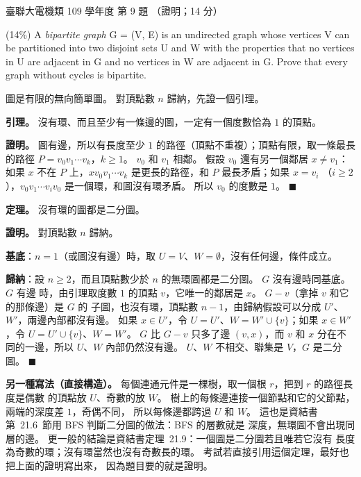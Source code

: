 \begin{pastexam}[label={px:ust-109-ee-ds-09}]{臺聯大電機類 109 學年度 第 9 題}
（證明；14 分）

(14\%) A \textit{bipartite graph} G = (V, E) is an undirected graph whose vertices V can be partitioned
into two disjoint sets U and W with the properties that no vertices in U are adjacent in G and no
vertices in W are adjacent in G. Prove that every graph without cycles is bipartite.
\end{pastexam}

\begin{pastsoln}
圖是有限的無向簡單圖。 對頂點數 $n$ 歸納，先證一個引理。

\textbf{引理。} 沒有環、而且至少有一條邊的圖，一定有一個度數恰為 $1$ 的頂點。

\textbf{證明。} 圖有邊，所以有長度至少 $1$ 的路徑（頂點不重複）；頂點有限，取一條最長的路徑
$P = v_0 v_1 \cdots v_k$，$k \ge 1$。 $v_0$ 和 $v_1$ 相鄰。 假設 $v_0$ 還有另一個鄰居 $x \ne v_1$：
如果 $x$ 不在 $P$ 上，$x v_0 v_1 \cdots v_k$ 是更長的路徑，和 $P$ 最長矛盾；如果 $x = v_i$
（$i \ge 2$），$v_0 v_1 \cdots v_i v_0$ 是一個環，和圖沒有環矛盾。 所以 $v_0$ 的度數是 $1$。
\hfill$\blacksquare$

\textbf{定理。} 沒有環的圖都是二分圖。

\textbf{證明。} 對頂點數 $n$ 歸納。

\textbf{基底}：$n = 1$（或圖沒有邊）時，取 $U = V$、$W = \emptyset$，沒有任何邊，條件成立。

\textbf{歸納}：設 $n \ge 2$，而且頂點數少於 $n$ 的無環圖都是二分圖。 $G$ 沒有邊時同基底。 $G$ 有邊
時，由引理取度數 $1$ 的頂點 $v$，它唯一的鄰居是 $x$。 $G - v$（拿掉 $v$ 和它的那條邊）是 $G$ 的
子圖，也沒有環，頂點數 $n - 1$，由歸納假設可以分成 $U'$、$W'$，兩邊內部都沒有邊。 如果
$x \in U'$，令 $U = U'$、$W = W' \cup \{v\}$；如果 $x \in W'$，令 $U = U' \cup \{v\}$、$W = W'$。
$G$ 比 $G - v$ 只多了邊 $(v, x)$，而 $v$ 和 $x$ 分在不同的一邊，所以 $U$、$W$ 內部仍然沒有邊。
$U$、$W$ 不相交、聯集是 $V$，$G$ 是二分圖。 \hfill$\blacksquare$

\textbf{另一種寫法（直接構造）。} 每個連通元件是一棵樹，取一個根 $r$，把到 $r$ 的路徑長度是偶數
的頂點放 $U$、奇數的放 $W$。 樹上的每條邊連接一個節點和它的父節點，兩端的深度差 $1$，奇偶不同，
所以每條邊都跨過 $U$ 和 $W$。 這也是資結書第~21.6~節用 BFS 判斷二分圖的做法：BFS 的層數就是
深度，無環圖不會出現同層的邊。 更一般的結論是資結書定理~21.9：一個圖是二分圖若且唯若它沒有
長度為奇數的環；沒有環當然也沒有奇數長的環。 考試若直接引用這個定理，最好也把上面的證明寫出來，
因為題目要的就是證明。
\end{pastsoln}
